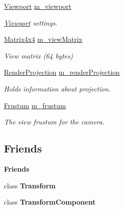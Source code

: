 \begin{Indent}
\begin{DoxyCompactItemize}
\mbox{\hyperlink{classrev_1_1_viewport}{Viewport}} \mbox{\hyperlink{classrev_1_1_camera_abfe972729c47b714bd17bb8495440510}{m\+\_\+viewport}}
\begin{DoxyCompactList}\small\item\em \mbox{\hyperlink{classrev_1_1_viewport}{Viewport}} settings. \end{DoxyCompactList}\item 
\mbox{\label{classrev_1_1_camera_ae4b130d87e1c77acf6b4ee09982346e1}} 
\mbox{\hyperlink{classrev_1_1_square_matrix}{Matrix4x4}} \mbox{\hyperlink{classrev_1_1_camera_ae4b130d87e1c77acf6b4ee09982346e1}{m\+\_\+view\+Matrix}}
\begin{DoxyCompactList}\small\item\em View matrix (64 bytes) \end{DoxyCompactList}\item 
\mbox{\hyperlink{classrev_1_1_render_projection}{Render\+Projection}} \mbox{\hyperlink{classrev_1_1_camera_ac0ef896bd514bc8659ab7f18183492f5}{m\+\_\+render\+Projection}}
\begin{DoxyCompactList}\small\item\em Holds information about projection. \end{DoxyCompactList}\item 
\mbox{\label{classrev_1_1_camera_ae8d1d32204b3cabd0770d167a79ae658}} 
\mbox{\hyperlink{classrev_1_1_frustum}{Frustum}} \mbox{\hyperlink{classrev_1_1_camera_ae8d1d32204b3cabd0770d167a79ae658}{m\+\_\+frustum}}
\begin{DoxyCompactList}\small\item\em The view frustum for the camera. \end{DoxyCompactList}\end{DoxyCompactItemize}
\end{Indent}
\subsection*{Friends}
\begin{Indent}\textbf{ Friends}\par
\begin{DoxyCompactItemize}
\item 
\mbox{\label{classrev_1_1_camera_af851b4d9aacd1a871da33592334b8d72}} 
class {\bfseries Transform}
\item 
\mbox{\label{classrev_1_1_camera_a0edcec9985d6a3f36e57ef258b49815c}} 
class {\bfseries Transform\+Component}
\end{DoxyCompactItemize}
\end{Indent}
